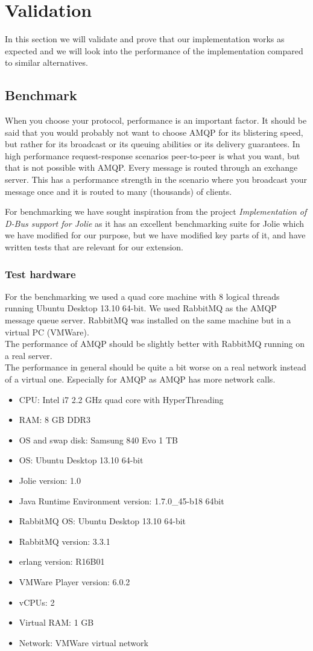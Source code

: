 \section{Validation}
In this section we will validate and prove that our implementation works as expected and we will look into the performance of the implementation compared to similar alternatives.
\subsection{Benchmark}
When you choose your protocol, performance is an important factor. It should be said that you would probably not want to choose AMQP for its blistering speed, but rather for its broadcast or its queuing abilities or its delivery guarantees. In high performance request-response scenarios peer-to-peer is what you want, but that is not possible with AMQP. Every message is routed through an exchange server. This has a performance strength in the scenario where you broadcast your message once and it is routed to many (thousands) of clients.

For benchmarking we have sought inspiration from the project \textit{Implementation of D-Bus support for Jolie}\cite{D-Bus} as it has an excellent benchmarking suite for Jolie which we have modified for our purpose, but we have modified key parts of it, and have written tests that are relevant for our extension.
\subsubsection{Test hardware}
For the benchmarking we used a quad core machine with 8 logical threads running Ubuntu Desktop 13.10 64-bit. We used RabbitMQ as the AMQP message queue server. RabbitMQ was installed on the same machine but in a virtual PC (VMWare).\\
The performance of AMQP should be slightly better with RabbitMQ running on a real server.\\
The performance in general should be quite a bit worse on a real network instead of a virtual one. Especially for AMQP as AMQP has more network calls.
\begin{itemize}
\item CPU: Intel i7 2.2 GHz quad core with HyperThreading
\item RAM: 8 GB DDR3
\item OS and swap disk: Samsung 840 Evo 1 TB
\item OS: Ubuntu Desktop 13.10 64-bit
\item Jolie version: 1.0
\item Java Runtime Environment version: 1.7.0\_45-b18 64bit
\item RabbitMQ OS: Ubuntu Desktop 13.10 64-bit
\item RabbitMQ version: 3.3.1
\item erlang version: R16B01
\item VMWare Player version: 6.0.2
\item vCPUs: 2
\item Virtual RAM: 1 GB
\item Network: VMWare virtual network
\end{itemize}
